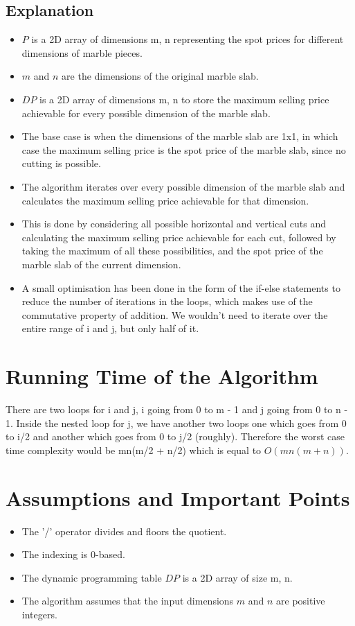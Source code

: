 \documentclass{article}
\begin{document}
\subsection{Explanation}
\begin{itemize}
    \item $P$ is a 2D array of dimensions m, n representing the spot prices for different dimensions of marble pieces.
    \item $m$ and $n$ are the dimensions of the original marble slab.
    \item $DP$ is a 2D array of dimensions m, n to store the maximum selling price achievable for every possible dimension of the marble slab.
    \item The base case is when the dimensions of the marble slab are 1x1, in which case the maximum selling price is the spot price of the marble slab, since no cutting is possible.
    \item The algorithm iterates over every possible dimension of the marble slab and calculates the maximum selling price achievable for that dimension.
    \item This is done by considering all possible horizontal and vertical cuts and calculating the maximum selling price achievable for each cut, followed by taking the maximum of all these possibilities, and the spot price of the marble slab of the current dimension.
    \item A small optimisation has been done in the form of the if-else statements to reduce the number of iterations in the loops, which makes use of the commutative property of addition. We wouldn't need to iterate over the entire range of i and j, but only half of it.
\end{itemize}

\section{Running Time of the Algorithm}
There are two loops for i and j, i going from 0 to m - 1 and j going from 0 to n - 1. Inside the nested loop for j, we have another two loops one which goes from 0 to i/2 and another which goes from 0 to j/2 (roughly).
Therefore the worst case time complexity would be mn(m/2 + n/2) which is equal to $O(mn(m + n))$.

\section{Assumptions and Important Points}

\begin{itemize}
    \item The '/' operator divides and floors the quotient.
    \item The indexing is 0-based.
    \item The dynamic programming table $DP$ is a 2D array of size m, n.
    \item The algorithm assumes that the input dimensions $m$ and $n$ are positive integers.
\end{itemize}
\end{document}
